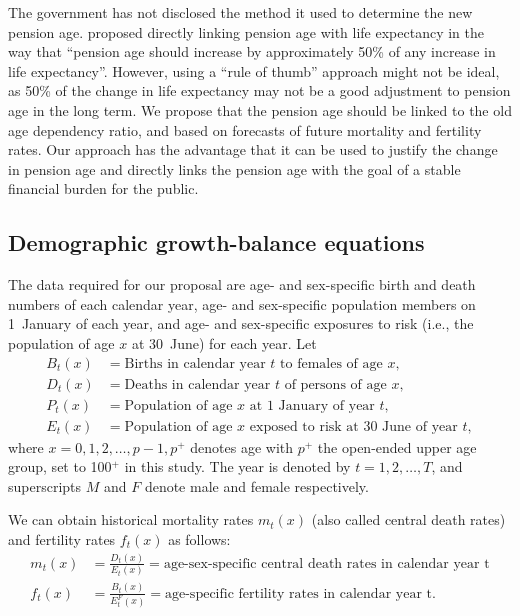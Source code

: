 \documentclass[11pt,a4paper,]{article}
\begin{document}
The government has not disclosed the method it used to determine the new pension age. \textcite[p7]{CEDA07} proposed directly linking pension age with life expectancy in the way that ``pension age should increase by approximately 50\% of any increase in life expectancy''. However, using a ``rule of thumb'' approach might not be ideal, as 50\% of the change in life expectancy may not be a good adjustment to pension age in the long term. We propose that the pension age should be linked to the old age dependency ratio, and based on forecasts of future mortality and fertility rates. Our approach has the advantage that it can be used to justify the change in pension age and directly links the pension age with the goal of a stable financial burden for the public.

\hypertarget{demographic-growth-balance-equations}{%
\subsection{Demographic growth-balance equations}\label{demographic-growth-balance-equations}}

The data required for our proposal are age- and sex-specific birth and death numbers of each calendar year, age- and sex-specific population members on 1~January of each year, and age- and sex-specific exposures to risk (i.e., the population of age \(x\) at 30~June) for each year. Let
\begin{align*}
  B_t(x) &= \text{Births in calendar year $t$ to females of age $x$},\\
  D_t(x) &= \text{Deaths in calendar year $t$ of persons of age $x$},\\
  P_t(x) &= \text{Population of age $x$ at 1 January of year $t$},\\
  E_t(x) &= \text{Population of age $x$ exposed to risk at 30 June of year $t$},
\end{align*}
where \(x=0,1,2,\dots,p-1,p^+\) denotes age with \(p^+\) the open-ended upper age group, set to 100\(^+\) in this study. The year is denoted by \(t=1,2,\dots,T\), and superscripts \(M\) and \(F\) denote male and female respectively.

We can obtain historical mortality rates \(m_t(x)\) (also called central death rates) and fertility rates \(f_t(x)\) as follows:
\begin{align*}
  m_t(x) & = \frac{D_t(x)}{E_t(x)}=\text{age-sex-specific central death rates in calendar year t}\\
  f_t(x) & = \frac{B_t(x)}{E^F_t(x)}=\text{age-specific fertility rates in calendar year t}.
\end{align*}
\end{document}
